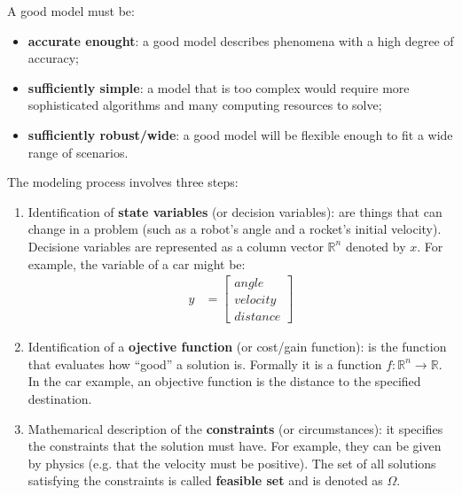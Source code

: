 A good model must be:
\begin{itemize}
    \item \textbf{accurate enought}: a good model describes phenomena with a high degree of accuracy;
    \item \textbf{sufficiently simple}: a model that is too complex would require more sophisticated algorithms and many computing resources to solve;
    \item \textbf{sufficiently robust/wide}: a good model will be flexible enough to fit a wide range of scenarios.
\end{itemize}

The modeling process involves three steps:
\begin{enumerate}
    \setlength\itemsep{.5em}

    \item Identification of \textbf{state variables} (or decision variables): are things that can change in a problem (such as a robot's angle and a rocket's initial velocity). Decisione variables are represented as a column vector \( \mathbb{R}^n \) denoted by \( x \). For example, the variable of a car might be:
    \begin{align*}
        y &= \begin{bmatrix}
                \mathit{angle} \\
                \mathit{velocity} \\
                \mathit{distance} 
             \end{bmatrix}
    \end{align*} 

    \item Identification of a \textbf{ojective function} (or cost/gain function): is the function that evaluates how ``good'' a solution is. Formally it is a function \( f : \mathbb{R}^n \rightarrow \mathbb{R} \). In the car example, an objective function is the distance to the specified destination.
    
    \item Mathemarical description of the \textbf{constraints} (or circumstances): it specifies the constraints that the solution must have. For example, they can be given by physics (e.g. that the velocity must be positive). 
    The set of all solutions satisfying the constraints is called \textbf{feasible set} and is denoted as \( \Omega \).
\end{enumerate}

